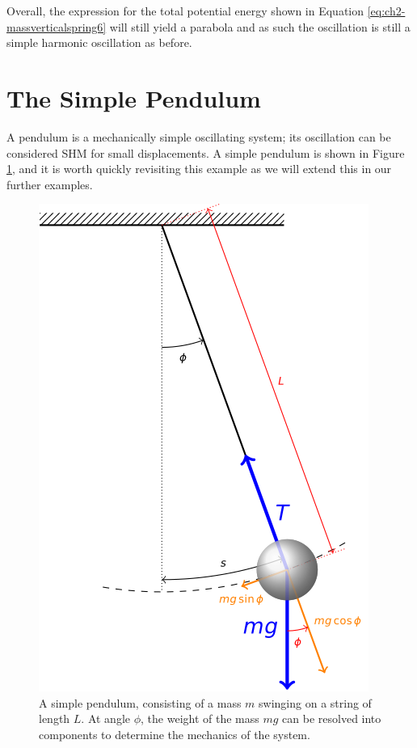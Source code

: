 \documentclass[
]{book}
\begin{document}
Overall, the expression for the total potential energy shown in Equation \eqref{eq:ch2-massverticalspring6} will still yield a parabola and as such the oscillation is still a simple harmonic oscillation as before.

\hypertarget{sec:ch2-simplependulum}{%
\section{The Simple Pendulum}\label{sec:ch2-simplependulum}}

A pendulum is a mechanically simple oscillating system; its oscillation can be considered SHM for small displacements. A simple pendulum is shown in Figure \ref{fig:ch2-simplependulum1}, and it is worth quickly revisiting this example as we will extend this in our further examples.

\begin{figure}

{\centering \includegraphics[width=0.7\linewidth]{visualisations/LaTeX/ch2-simplependulum1} 

}

\caption{A simple pendulum, consisting of a mass $m$ swinging on a string of length $L$. At angle $\phi$, the weight of the mass $mg$ can be resolved into components to determine the mechanics of the system.}\label{fig:ch2-simplependulum1}
\end{figure}
\end{document}
